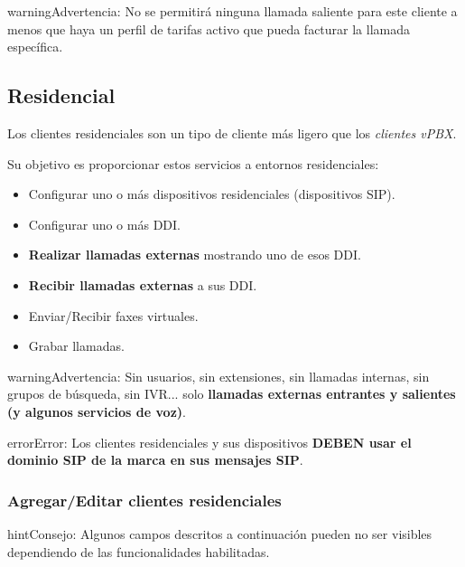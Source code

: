 \documentclass[letterpaper,10pt,spanish]{sphinxmanual}
\begin{document}
\begin{notice}{warning}{Advertencia:}
No se permitirá ninguna llamada saliente para este cliente a menos que haya un perfil de tarifas activo que pueda facturar la llamada específica.
\end{notice}


\subsection{Residencial}
\label{administration_portal/brand/clients/residential:residential}\label{administration_portal/brand/clients/residential::doc}
Los clientes residenciales son un tipo de cliente más ligero que los \emph{clientes vPBX}.

Su objetivo es proporcionar estos servicios a entornos residenciales:
\begin{itemize}
\item {} 
Configurar uno o más dispositivos residenciales (dispositivos SIP).

\item {} 
Configurar uno o más DDI.

\item {} 
\textbf{Realizar llamadas externas} mostrando uno de esos DDI.

\item {} 
\textbf{Recibir llamadas externas} a sus DDI.

\item {} 
Enviar/Recibir faxes virtuales.

\item {} 
Grabar llamadas.

\end{itemize}

\begin{notice}{warning}{Advertencia:}
Sin usuarios, sin extensiones, sin llamadas internas, sin grupos de búsqueda, sin IVR... solo \textbf{llamadas externas entrantes y salientes (y algunos servicios de voz)}.
\end{notice}

\begin{notice}{error}{Error:}
Los clientes residenciales y sus dispositivos \textbf{DEBEN usar el dominio SIP de la marca en sus mensajes SIP}.
\end{notice}


\subsubsection{Agregar/Editar clientes residenciales}
\label{administration_portal/brand/clients/residential:adding-editing-residential-clients}
\begin{notice}{hint}{Consejo:}
Algunos campos descritos a continuación pueden no ser visibles dependiendo de las funcionalidades habilitadas.
\end{notice}
\end{document}
